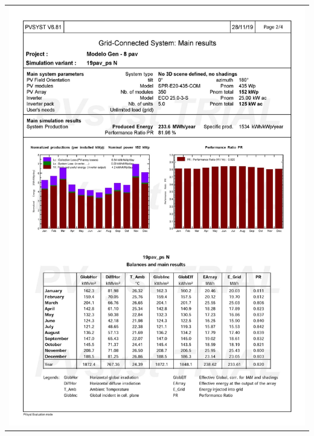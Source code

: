\begin{table}[H]
    \centering
    \begin{tabular}{l}
        \includegraphics[width=\textwidth]{figures/attachments/resultpv32.jpg}
    \end{tabular}
\end{table}
\pagebreak
